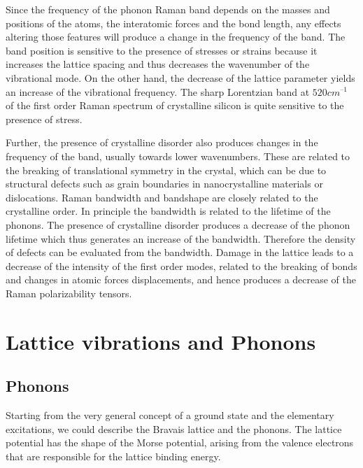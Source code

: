 \documentclass[openany,11pt,a4paper]{report}
\begin{document}
Since the frequency of the phonon Raman band depends on the
masses and positions of the atoms, the interatomic forces and the bond length, any effects altering those features will produce a change in the frequency of the band. The band position is sensitive to the presence of
stresses or strains because it increases the lattice spacing and thus decreases the wavenumber of the vibrational mode. On the other hand, the decrease of the lattice parameter yields an increase of the vibrational frequency. The sharp Lorentzian band
at $520 cm^{–1}$ of the first order Raman spectrum of crystalline silicon is quite sensitive to the presence of stress.\

Further, the presence of crystalline disorder also produces
changes in the frequency of the band, usually towards lower
wavenumbers. These are related to the breaking of translational symmetry in the crystal, which can be due to structural defects such as grain boundaries in nanocrystalline materials or dislocations. Raman bandwidth and bandshape are closely related to the crystalline order. In principle the bandwidth is related to the lifetime of the phonons. The presence of crystalline disorder produces a decrease of the phonon lifetime which thus generates an increase of the bandwidth. Therefore the density
of defects can be evaluated from the bandwidth. Damage in the lattice leads to a decrease of the intensity of the first
order modes, related to the breaking of bonds and changes
in atomic forces displacements, and hence produces a
decrease of the Raman polarizability tensors.
\cite{kiauto}

\newpage


\section{Lattice vibrations and Phonons}

\subsection{Phonons}

Starting from the very general concept of a ground state and the elementary excitations, we could describe the Bravais lattice and the phonons. The lattice potential has the shape of the Morse potential, arising from the valence electrons that are responsible for the lattice binding energy.
\end{document}
